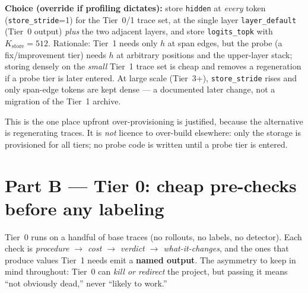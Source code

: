 \documentclass[11pt]{article}
\newcommand{\out}[1]{\texttt{#1}}      %
\newcommand{\param}[1]{\texttt{#1}}    %
\begin{document}
\begin{choice}
\textbf{Choice (override if profiling dictates):} store \out{hidden} at
\emph{every} token (\param{store\_stride}=1) for the Tier~0/1 trace set, at the
single layer \param{layer\_default} (Tier~0 output) \emph{plus} the two adjacent
layers, and store \out{logits\_topk} with $K_{\text{store}}=512$. Rationale:
Tier~1 needs only $h$ at span edges, but the probe (a fix/improvement tier) needs
$h$ at arbitrary positions and the upper-layer stack; storing densely on the
\emph{small} Tier~1 trace set is cheap and removes a regeneration if a probe tier
is later entered. At large scale (Tier~3+), \param{store\_stride} rises and only
span-edge tokens are kept dense --- a documented later change, not a migration of
the Tier~1 archive.
\end{choice}

\begin{honest}
This is the one place upfront over-provisioning is justified, because the
alternative is regenerating traces. It is \emph{not} licence to over-build
elsewhere: only the storage is provisioned for all tiers; no probe code is written
until a probe tier is entered.
\end{honest}

\section{Part B --- Tier 0: cheap pre-checks before any labeling}
\label{sec:tier0}

Tier~0 runs on a handful of base traces (no rollouts, no labels, no detector). Each
check is \emph{procedure $\to$ cost $\to$ verdict $\to$ what-it-changes}, and the
ones that produce values Tier~1 needs emit a \textbf{named output}. The asymmetry
to keep in mind throughout: Tier~0 can \emph{kill or redirect} the project, but
passing it means ``not obviously dead,'' never ``likely to work.''
\end{document}
